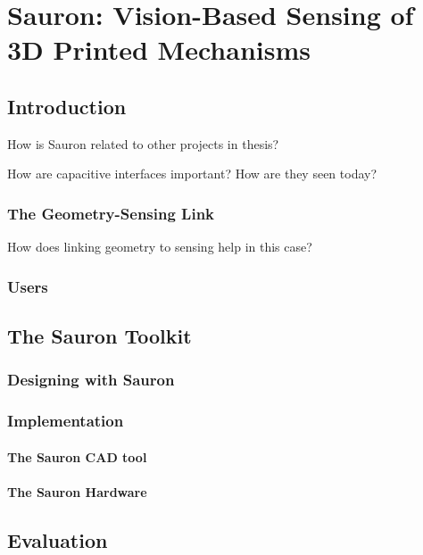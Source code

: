 \chapter{Sauron: Vision-Based Sensing of 3D Printed Mechanisms}

\section{Introduction}

How is Sauron related to other projects in thesis?

How are capacitive interfaces important?  How are they seen today?

\subsection{The Geometry-Sensing Link}

How does linking geometry to sensing help in this case?

\subsection{Users}

\section{The Sauron Toolkit}

\subsection{Designing with Sauron}

\subsection{Implementation}

\subsubsection{The Sauron CAD tool}

\subsubsection{The Sauron Hardware}

\section{Evaluation}

